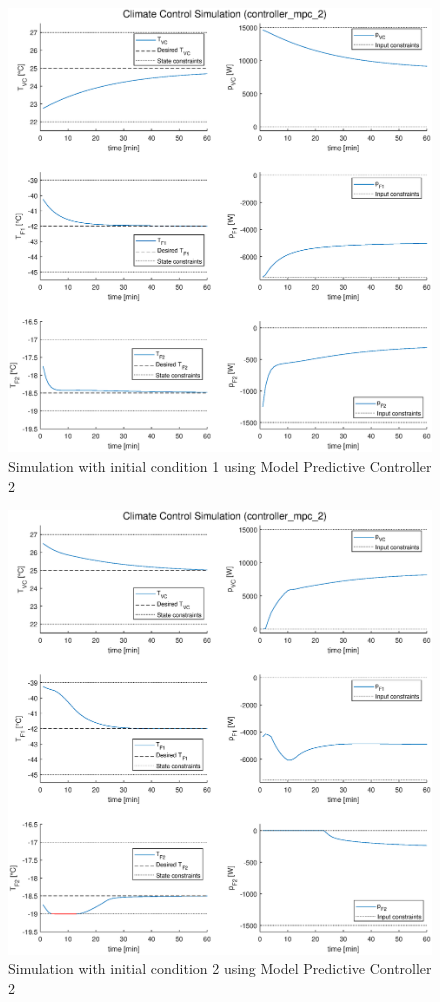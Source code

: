 \documentclass[a4paper,twoside,11pt]{article}
\numberwithin{equation}{section}
\begin{document}
\begin{figure}[ht]
\centering
\includegraphics[scale = 0.58]{image/13-1.eps}
\caption{Simulation with initial condition 1 using Model Predictive Controller 2}
\label{fig:9}
\end{figure}

\newpage

\begin{figure}[ht]
\centering
\includegraphics[scale = 0.58]{image/13-2.eps}
\caption{Simulation with initial condition 2 using Model Predictive Controller 2}
\label{fig:10}
\end{figure}
\end{document}
